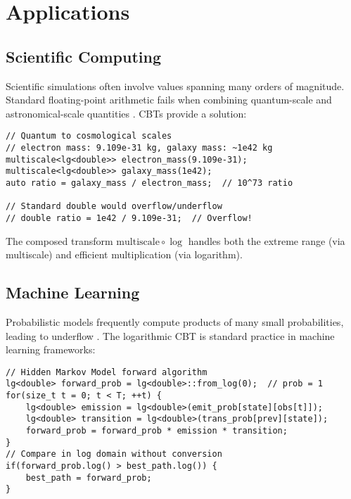 \documentclass[11pt]{article}
\theoremstyle{definition}
\begin{document}
\section{Applications}
\label{sec:applications}

\subsection{Scientific Computing}

Scientific simulations often involve values spanning many orders of magnitude. Standard floating-point arithmetic fails when combining quantum-scale and astronomical-scale quantities \cite{goldberg1991every}. CBTs provide a solution:

\begin{lstlisting}[caption={Multi-scale physics simulation using composed CBTs}]
// Quantum to cosmological scales  
// electron mass: 9.109e-31 kg, galaxy mass: ~1e42 kg
multiscale<lg<double>> electron_mass(9.109e-31);
multiscale<lg<double>> galaxy_mass(1e42);
auto ratio = galaxy_mass / electron_mass;  // 10^73 ratio

// Standard double would overflow/underflow
// double ratio = 1e42 / 9.109e-31;  // Overflow!
\end{lstlisting}

The composed transform $\text{multiscale} \circ \log$ handles both the extreme range (via multiscale) and efficient multiplication (via logarithm).

\subsection{Machine Learning}

Probabilistic models frequently compute products of many small probabilities, leading to underflow \cite{bishop2006pattern}. The logarithmic CBT is standard practice in machine learning frameworks:

\begin{lstlisting}[caption={Stable probability computation in log domain}]
// Hidden Markov Model forward algorithm
lg<double> forward_prob = lg<double>::from_log(0);  // prob = 1
for(size_t t = 0; t < T; ++t) {
    lg<double> emission = lg<double>(emit_prob[state][obs[t]]);
    lg<double> transition = lg<double>(trans_prob[prev][state]);
    forward_prob = forward_prob * emission * transition;
}
// Compare in log domain without conversion
if(forward_prob.log() > best_path.log()) {
    best_path = forward_prob;
}
\end{lstlisting}
\end{document}
